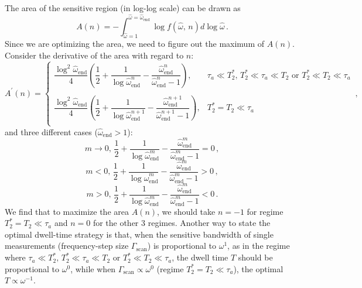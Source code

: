 \documentclass{WileyMSP-template}
\newcommand{\YZ}[1]{\textcolor{purple}{Yuzhe: #1}}
\begin{document}
	The area of the sensitive region (in log-log scale) can be drawn as
	\begin{equation}
		A(n) = -\int_{\hat{\omega}=1}^{\hat{\omega}=\hat{\omega}_{\mathrm{end}}} \log f(\hat{\omega},\, n) d\log\hat{\omega}
		\,.\label{eq:A_n}
	\end{equation}
	Since we are optimizing the area, we need to figure out the maximum of $A(n)$. Consider the derivative of the area with regard to $n$:
	\begin{equation}
		A^{'}(n) = \left\{
		\begin{array}{ll}
			\dfrac{\log^2\hat{\omega}_{\mathrm{end}}}{4} 
			\left( 
			\dfrac{1}{2} + \dfrac{1}{\log \hat{\omega}_{\mathrm{end}}^n }
			-\dfrac{\hat{\omega}_{\mathrm{end}}^n }{ \hat{\omega}_{\mathrm{end}}^n-1 }    
			\right)
			,
			& \tau_a\ll T_2^* ,\, T_2^*\ll\tau_a\ll T_2  \text{ or }  T_2^* \ll T_2 \ll \tau_a  \\
			& \\

			\dfrac{\log^2\hat{\omega}_{\mathrm{end}}}{4} 
			\left( 
			\dfrac{1}{2} + \dfrac{1}{\log \hat{\omega}_{\mathrm{end}}^{n+1} }
			-\dfrac{\hat{\omega}_{\mathrm{end}}^{n+1} }{ \hat{\omega}_{\mathrm{end}}^{n+1}-1 }    
			\right),
			&  T_2^*=T_2 \ll \tau_a  \\
		\end{array} \right.
		\,,\label{eq:dA_dn}
	\end{equation}
	and three different cases ($\hat{\omega}_{\mathrm{end}}>1$):
	\begin{equation}
		m\to0,\,\dfrac{1}{2} + \dfrac{1}{\log \hat{\omega}_{\mathrm{end}}^m }
		-\dfrac{\hat{\omega}_{\mathrm{end}}^m }{ \hat{\omega}_{\mathrm{end}}^m-1 } = 0
		\,,
	\end{equation}
	\begin{equation}
		m<0,\,\dfrac{1}{2} + \dfrac{1}{\log \hat{\omega}_{\mathrm{end}}^m }
		-\dfrac{\hat{\omega}_{\mathrm{end}}^m }{ \hat{\omega}_{\mathrm{end}}^m-1 } > 0
		\,,
	\end{equation}
	\begin{equation}
		m>0,\,\dfrac{1}{2} + \dfrac{1}{\log \hat{\omega}_{\mathrm{end}}^m }
		-\dfrac{\hat{\omega}_{\mathrm{end}}^m }{ \hat{\omega}_{\text{end}}^m-1 } < 0
		\,.
	\end{equation}
	We find that to maximize the area $A(n)$, we should take $n=-1$ for regime $T_2^*=T_2 \ll \tau_a$ and $n=0$ for the other 3 regimes. 
	Another way to state the optimal dwell-time strategy is that, when the sensitive bandwidth of single measurements (frequency-step size $\Gamma_{\mathrm{scan}}$) is proportional to $\omega^1$, as in the regime where $\tau_a\ll T_2^* ,\, T_2^*\ll\tau_a\ll T_2  \text{ or }  T_2^* \ll T_2 \ll \tau_a$, the dwell time $T$ should be proportional to $\omega^0$, while when $\Gamma_{\mathrm{scan}} \propto\omega^0$ (regime $T_2^*=T_2\ll\tau_a$), the optimal $T\propto\omega^{-1}$. 
\end{document}
